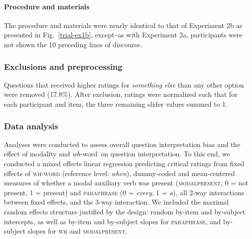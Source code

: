 \documentclass[12pt,letterpaper,table,svgnames,dvipsnames]{article}
\newcommand{\figref}[1]{Fig.~\ref{#1}}
\newcommand{\whq}{\emph{wh}-question~}
\newcommand{\whw}{\emph{wh}-word~}
\begin{document}
\paragraph{Procedure and materials}
The procedure and materials were nearly identical to that of Experiment 2b as presented in \figref{trial-ex1b}, except--as with Experiment 2a, participants were not shown the 10 preceding lines of discourse.


\subsubsection{Exclusions and preprocessing}
Questions that received higher ratings for \emph{something else} than any other option were removed (17.8\%). After exclusion, ratings were normalized such that for each participant and item, the three remaining slider values summed to 1.


\subsubsection{Data analysis}
Analyses were conducted to assess overall question interpretation bias and the effect of modality and \whw on question interpretation. To this end, we conducted a mixed effects linear regression predicting critical ratings from fixed effects of \textsc{wh-word} (reference level: \emph{when}), dummy-coded and mean-centered measures of whether a modal auxiliary verb was present (\textsc{modalpresent}, 0 = not present, 1 = present) and \textsc{paraphrase} (0 = \emph{every}, 1 = \emph{a}), all 2-way interactions between fixed effects, and the 3-way interaction. We included the maximal random effects structure justified by the design: random by-item and by-subject intercepts, as well as by-item and by-subject slopes for \textsc{paraphrase}, and by-subject slopes for \textsc{wh} and \textsc{modalpresent}. 
\end{document}
